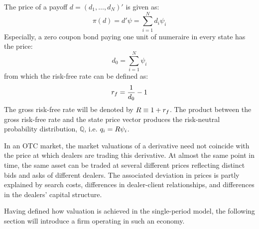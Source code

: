 \documentclass[main.tex]{subfiles}
\begin{document}
        The price of a payoff $d=\left(d_{1}, \dots, d_{N}\right)'$ is given as:
            \begin{equation}
                \pi(d) = d'\psi = \sum_{i=1}^{N} d_{i}\psi_{i}
            \end{equation}
        Especially, a zero coupon bond paying one unit of numeraire in every state has the price:
            \begin{equation}
                d_{0} = \sum_{i=1}^{N} \psi_{i}
            \end{equation}
        from which the risk-free rate can be defined as:
            \begin{equation}
                r_{f} = \frac{1}{d_{0}} - 1
            \end{equation}
        The gross risk-free rate will be denoted by $R \equiv 1 + r_{f}$.
        The product between the gross risk-free rate and the state price vector produces the risk-neutral probability distribution, $\mathbb{Q}$, i.e. $q_{i} = R\psi_{i}$.

        In an OTC market, the market valuations of a derivative need not coincide with the price at which dealers are trading this derivative.
        At almost the same point in time, the same asset can be traded at several different prices reflecting distinct bids and asks of different dealers.
        The associated deviation in prices is partly explained by search costs, differences in dealer-client relationships, and differences in the dealers' capital structure.

        Having defined how valuation is achieved in the single-period model,
        the following section will introduce a firm operating in such an economy.
\end{document}
